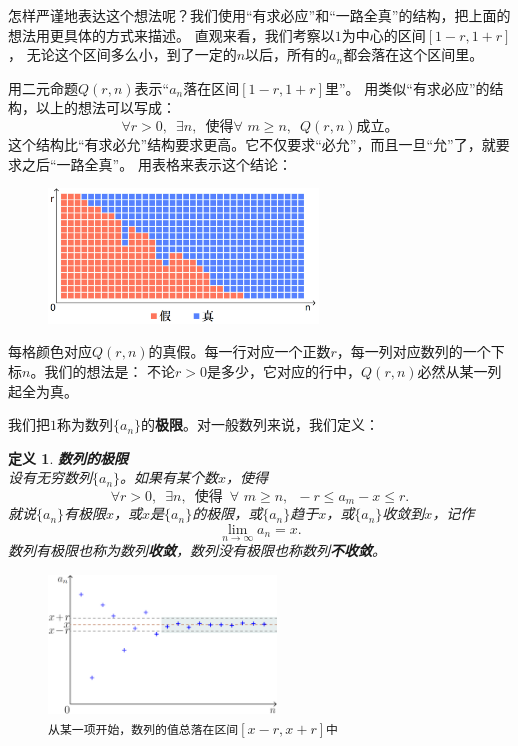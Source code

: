 \documentclass[12pt,UTF8]{ctexbook}
\newtheorem{df}{定义}[section]
\begin{document}
怎样严谨地表达这个想法呢？我们使用“有求必应”和“一路全真”的结构，把上面的想法用更具体的方式来描述。
直观来看，我们考察以$1$为中心的区间$[1-r,1+r]$，
无论这个区间多么小，到了一定的$n$以后，所有的$a_n$都会落在这个区间里。

用二元命题$Q(r, n)$表示“$a_n$落在区间$[1-r,1+r]$里”。
用类似“有求必应”的结构，以上的想法可以写成：
$$\forall r > 0, \,\,\, \exists n,  \,\,\, \mbox{使得} \forall \,\, m \geqslant n, \,\,\, Q(r, n)\mbox{成立。}$$
这个结构比“有求必允”结构要求更高。它不仅要求“必允”，而且一旦“允”了，就要求之后“一路全真”。
用表格来表示这个结论：

\begin{figure}[h] %
    \centering
    \includegraphics[width=0.64\textwidth]{数列极限2.png}
\end{figure}

每格颜色对应$Q(r, n)$的真假。每一行对应一个正数$r$，每一列对应数列的一个下标$n$。我们的想法是：
不论$r>0$是多少，它对应的行中，$Q(r, n)$必然从某一列起全为真。

我们把$1$称为数列$\{a_n\}$的\textbf{极限}。对一般数列来说，我们定义：
\begin{df}\textbf{数列的极限} \\
设有无穷数列$\{a_n\}$。如果有某个数$x$，使得
$$ \forall r > 0, \,\,\, \exists n,  \,\,\, \mbox{使得} \,\,\, \forall \,\, m \geqslant n, \,\,\, - r \leqslant a_m - x \leqslant r. $$
就说$\{a_n\}$有极限$x$，或$x$是$\{a_n\}$的极限，或$\{a_n\}$趋于$x$，或$\{a_n\}$收敛到$x$，记作
$$\lim_{n\to\infty} a_n = x.$$
数列有极限也称为数列\textbf{收敛}，数列没有极限也称数列\textbf{不收敛}。
\end{df}

\begin{figure}[h] %
    \vspace{-14pt}
    \centering
    \includegraphics[width=0.54\textwidth]{数列极限1.png}
    \caption*{\texttt{从某一项开始，数列的值总落在区间}$[x-r,x+r]$\texttt{中}}
\end{figure}
\end{document}
